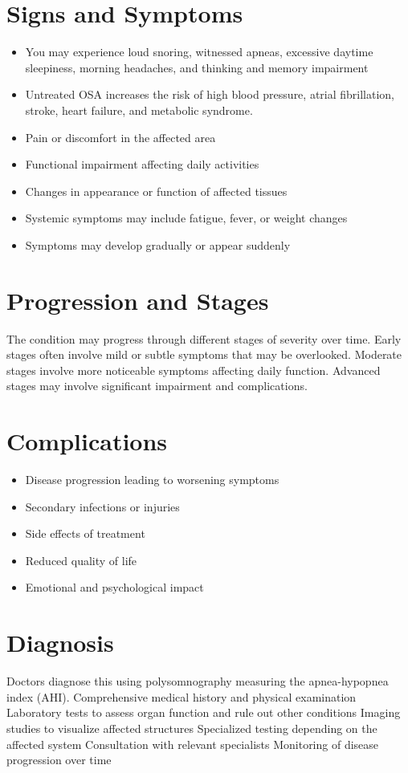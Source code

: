 \section{Signs and Symptoms}
\begin{itemize}[noitemsep]
  \item You may experience loud snoring, witnessed apneas, excessive daytime sleepiness, morning headaches, and thinking and memory impairment
  \item Untreated OSA increases the risk of high blood pressure, atrial fibrillation, stroke, heart failure, and metabolic syndrome.
  \item Pain or discomfort in the affected area
  \item Functional impairment affecting daily activities
  \item Changes in appearance or function of affected tissues
  \item Systemic symptoms may include fatigue, fever, or weight changes
  \item Symptoms may develop gradually or appear suddenly
\end{itemize}
\section{Progression and Stages}
The condition may progress through different stages of severity over time. Early stages often involve mild or subtle symptoms that may be overlooked. Moderate stages involve more noticeable symptoms affecting daily function. Advanced stages may involve significant impairment and complications.
\section{Complications}
\begin{itemize}[noitemsep]
  \item Disease progression leading to worsening symptoms
  \item Secondary infections or injuries
  \item Side effects of treatment
  \item Reduced quality of life
  \item Emotional and psychological impact
\end{itemize}
\section{Diagnosis}
Doctors diagnose this using polysomnography measuring the apnea-hypopnea index (AHI). Comprehensive medical history and physical examination Laboratory tests to assess organ function and rule out other conditions Imaging studies to visualize affected structures Specialized testing depending on the affected system Consultation with relevant specialists Monitoring of disease progression over time

